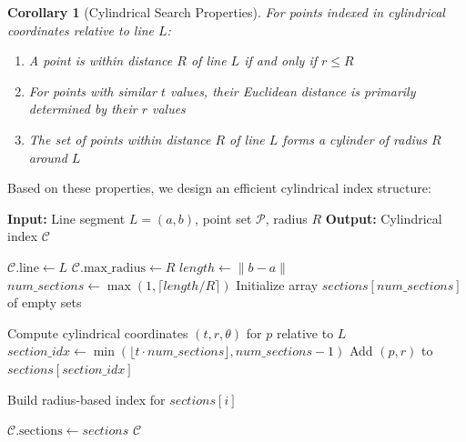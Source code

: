 \documentclass[numbers,sort]{article}
\newtheorem{corollary}{Corollary}
\begin{document}
\begin{corollary}[Cylindrical Search Properties]
\label{thm:cylindrical-search}
For points indexed in cylindrical coordinates relative to line $L$:
\begin{enumerate}
\item A point is within distance $R$ of line $L$ if and only if $r \leq R$
\item For points with similar $t$ values, their Euclidean distance is primarily determined by their $r$ values
\item The set of points within distance $R$ of line $L$ forms a cylinder of radius $R$ around $L$
\end{enumerate}
\end{corollary}

Based on these properties, we design an efficient cylindrical index structure:

\begin{algorithm}
\caption{Cylindrical Index Construction}
\label{alg:cylindrical_index_onstruction}
\begin{algorithmic}[1]
\STATE \textbf{Input:} Line segment $L = (a, b)$, point set $\mathcal{P}$, radius $R$
\STATE \textbf{Output:} Cylindrical index $\mathcal{C}$

\STATE $\mathcal{C}.\text{line} \leftarrow L$
\STATE $\mathcal{C}.\text{max\_radius} \leftarrow R$
\STATE $length \leftarrow \|b-a\|$
\STATE $num\_sections \leftarrow \max(1, \lceil length / R \rceil)$ 
\STATE Initialize array $sections[num\_sections]$ of empty sets

    \STATE Compute cylindrical coordinates $(t, r, \theta)$ for $p$ relative to $L$
        \STATE $section\_idx \leftarrow \min(\lfloor t \cdot num\_sections \rfloor, num\_sections - 1)$
        \STATE Add $(p, r)$ to $sections[section\_idx]$
    \ENDIF
\ENDFOR

    \STATE Build radius-based index for $sections[i]$ 
\ENDFOR

\STATE $\mathcal{C}.\text{sections} \leftarrow sections$
\RETURN $\mathcal{C}$
\end{algorithmic}
\end{algorithm}
\end{document}
